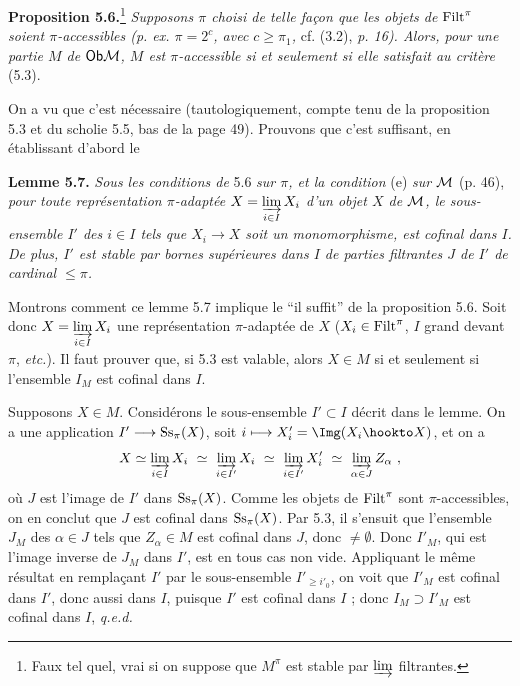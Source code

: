 \textbf{Proposition 5.6.}\footnote[21]{Faux tel quel, vrai si on suppose que $M^{\pi}$ est stable par $\varinjlim$ filtrantes.} \textit{Supposons $\pi$ choisi de telle façon que les objets de} $\mathrm{Filt}^{\pi}$ \textit{soient $\pi$-accessibles (p. ex. $\pi = 2^{c}$, avec $c \geq \pi_1$,} cf. (3.2), \textit{p. 16). Alors, pour une partie $M$ de} $\mathsf{Ob}\mathcal{M}$\textit{, $M$ est $\pi$-accessible si et seulement si elle satisfait au critère} (5.3).

On a vu que c'est nécessaire (tautologiquement, compte tenu de la proposition 5.3 et du scholie 5.5, bas de la page 49). Prouvons que c'est suffisant, en établissant d'abord le

\textbf{Lemme 5.7.} \textit{Sous les conditions de} 5.6 \textit{sur $\pi$, et la condition} (e) \textit{sur $\mathcal{M}$} (p. 46), \textit{pour toute représentation $\pi$-adaptée $X = \varinjlim\limits_{i\in I} X_i$ d'un objet $X$ de $\mathcal{M}$, le sous-ensemble $I'$ des $i \in I$ tels que $X_i \longrightarrow X$ soit un monomorphisme, est cofinal dans $I$. De plus, $I'$ est stable par bornes supérieures dans $I$ de parties filtrantes $J$ de $I'$ de cardinal $\leq \pi$.}

Montrons comment ce lemme 5.7 implique le ``il suffit'' de la proposition 5.6. Soit donc $X = \varinjlim\limits_{i\in I} X_i$ une représentation $\pi$-adaptée de $X$ ($X_i \in \mathrm{Filt}^{\pi}$, $I$ grand devant $\pi$, \textit{etc.}). Il faut prouver que, si 5.3 est valable, alors $X \in M$ si et seulement si l'ensemble $I_M$ est cofinal dans $I$.

Supposons $X \in M$. Considérons le sous-ensemble $I' \subset I$ décrit dans le lemme. On a une application $I' \longrightarrow \mathrm{Ss}_{\pi}(X)$, soit $i \longmapsto X'_i = \Img (X_i \hookto X)$, et on a
\[
X \simeq \varinjlim_{i\in I} X_i \ \simeq \ \varinjlim_{i\in I'} X_i \ \simeq \ \varinjlim_{i\in I'} X'_i \ \simeq \ \varinjlim_{\alpha\in J} Z_{\alpha} \ ,
\]
où $J$ est l'image de $I'$ dans $\mathrm{Ss}_{\pi}(X)$. Comme les objets de $\mathrm{Filt}^{\pi}$ sont $\pi$-accessibles, on en conclut que $J$ est cofinal dans $\mathrm{Ss}_{\pi}(X)$. Par 5.3, il s'ensuit que l'ensemble $J_M$ des $\alpha \in J$
tels que $Z_{\alpha} \in M$ est cofinal dans $J$, donc $\neq \emptyset$. Donc $I'_M$, qui est l'image inverse de $J_M$ dans $I'$, est en tous cas non vide. Appliquant le même résultat en remplaçant $I'$ par le sous-ensemble $I'_{\geq i'_0}$, on voit que $I'_M$ est cofinal dans $I'$, donc aussi dans $I$, puisque $I'$ est cofinal dans $I$ ; donc $I_M \supset I'_M$ est cofinal dans $I$, \quad \textit{q.e.d.}

